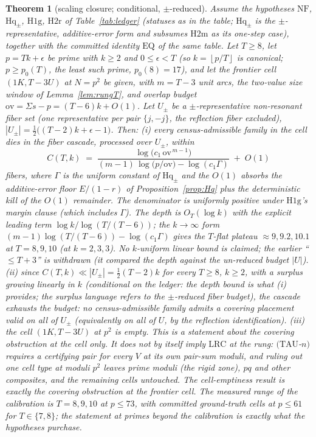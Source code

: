 \documentclass[11pt,a4paper]{article}
\numberwithin{equation}{section}
\theoremstyle{plain}
\newtheorem{theorem}{Theorem}[section]
\theoremstyle{definition}
\theoremstyle{remark}
\newcommand{\floor}[1]{\left\lfloor #1 \right\rfloor}
\begin{document}
\begin{theorem}[scaling closure; conditional, $\pm$-reduced]\label{thm:SC}
Assume the hypotheses $\mathrm{NF}$, $\mathrm{Hq}_\pm$, $\mathrm{H1g}$,
$\mathrm{H2r}$ of Table~\ref{tab:ledger} (statuses as in the table;
$\mathrm{Hq}_\pm$ is the $\pm$-representative, additive-error form and
subsumes $\mathrm{H2m}$ as its one-step case), together with the
committed identity $\mathrm{EQ}$ of the same table. Let $T\ge 8$, let
$p=Tk+\epsilon$ be prime with $k\ge 2$ and $0\le\epsilon<T$ (so $k=\floor{p/T}$
is canonical; $p\ge p_0(T)$, the least such prime, $p_0(8)=17$), and let the
frontier cell $(1K,T{-}3U)$ at $N=p^2$ be given, with $m=T-3$ unit arcs, the
two-value size window of Lemma~\ref{lem:rungT}, and overlap budget
$\mathrm{ov}=\Sigma s-p=(T-6)k+O(1)$. Let $U_\pm$ be a $\pm$-representative
non-resonant fiber set (one representative per pair $\{j,-j\}$, the
reflection fiber excluded), $|U_\pm|=\tfrac12\bigl((T-2)k+\epsilon-1\bigr)$.
Then:
\smallskip
\emph{(i)} every census-admissible family in the cell dies in the fiber
cascade, processed over $U_\pm$, within
\[
C(T,k)\;=\;
\frac{\log\!\bigl(c_1\,\mathrm{ov}^{\,m-1}\bigr)}
     {(m-1)\,\log\!\bigl(p/\mathrm{ov}\bigr)-\log(c_1\Gamma)}
\;+\;O(1)
\]
fibers, where $\Gamma$ is the uniform constant of $\mathrm{Hq}_\pm$ and the
$O(1)$ absorbs the additive-error floor $E/(1-r)$ of
Proposition~\ref{prop:Hq} plus the deterministic kill of the $O(1)$
remainder. The denominator is uniformly positive under $\mathrm{H1g}$'s
margin clause (which includes $\Gamma$). The depth is $O_T(\log k)$ with the
explicit leading term $\log k/\log(T/(T-6))$; the $k\to\infty$ form
$(m-1)\log(T/(T-6))-\log(c_1\Gamma)$ gives the $T$-flat plateau
$\approx 9,9.2,10.1$ at $T=8,9,10$ (at $k=2,3,3$). \emph{No $k$-uniform
linear bound is claimed}; the earlier ``$\le T+3$'' is withdrawn (it compared
the depth against the un-reduced budget $|U|$).
\smallskip
\emph{(ii)} since $C(T,k)\ll|U_\pm|=\tfrac12(T-2)k$ for every $T\ge8$,
$k\ge2$, with a surplus growing linearly in $k$ (conditional on the ledger:
the depth bound is what (i) provides; the surplus language refers to the
$\pm$-reduced fiber budget), the cascade exhausts the budget: no
census-admissible family admits a covering placement valid on all of
$U_\pm$ (equivalently on all of $U$, by the reflection identification).
\smallskip
\emph{(iii)} the cell $(1K,T{-}3U)$ at $p^2$ is empty. \emph{This is a
statement about the covering obstruction at the cell only.} It does not by
itself imply $\mathrm{LRC}$ at the rung: $(\mathrm{TAU}$-$n)$ requires a
certifying pair for every $V$ at its own pair-sum moduli, and ruling out one
cell type at moduli $p^2$ leaves prime moduli (the rigid zone), $pq$ and
other composites, and the remaining cells untouched. The cell-emptiness
result is exactly the covering obstruction at the frontier cell.
The measured range of the calibration is $T=8,9,10$ at $p\le 73$, with
committed ground-truth cells at $p\le 61$ for $T\in\{7,8\}$; the statement
at primes beyond the calibration is exactly what the hypotheses purchase.
\end{theorem}
\end{document}
